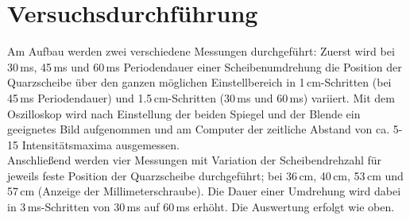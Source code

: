 \section{Versuchsdurchführung}
Am Aufbau werden zwei verschiedene Messungen durchgeführt:
Zuerst wird bei 30\,ms, 45\,ms und 60\,ms Periodendauer einer Scheibenumdrehung
die Position der Quarzscheibe über den ganzen möglichen Einstellbereich
in 1\,cm-Schritten (bei 45\,ms Periodendauer) und 1.5\,cm-Schritten (30\,ms und 60\,ms) variiert.
Mit dem Oszilloskop wird nach Einstellung der beiden Spiegel und der Blende ein geeignetes Bild aufgenommen und
am Computer der zeitliche Abstand von ca. 5-15 Intensitätsmaxima ausgemessen.\\
Anschließend werden vier Messungen mit Variation der Scheibendrehzahl für
jeweils feste Position der Quarzscheibe durchgeführt; bei
36\,cm, 40\,cm, 53\,cm und 57\,cm (Anzeige der Millimeterschraube).
Die Dauer einer Umdrehung wird dabei in 3\,ms-Schritten von 30\,ms auf 60\,ms erhöht.
Die Auswertung erfolgt wie oben.